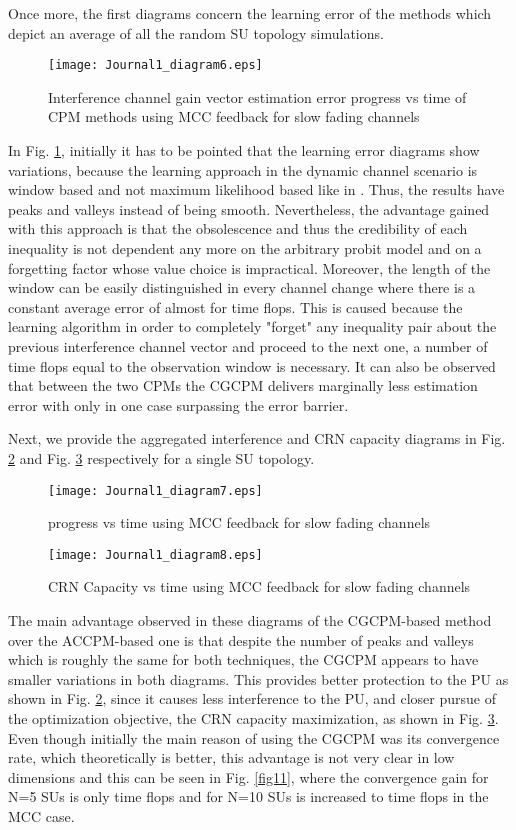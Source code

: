 \documentclass[journal]{IEEEtran}
\begin{document}
Once more, the first diagrams concern the learning error of the methods which depict an average of all the random SU topology simulations.

\begin{figure}[!h]
\centering
\texttt{[image: Journal1\_diagram6.eps]}
\caption{Interference channel gain vector estimation error progress vs time of CPM methods using MCC feedback for slow fading channels}
\label{fig8}
\end{figure}
In Fig. \ref{fig8}, initially it has to be pointed that the learning error diagrams show variations, because the learning approach in the dynamic channel scenario is window based and not maximum likelihood based like in \cite{biban73}. Thus, the results have peaks and valleys instead of being smooth. Nevertheless, the advantage gained with this approach is that the obsolescence and thus the credibility of each inequality is not dependent any more on the arbitrary probit model and on a forgetting factor whose value choice is impractical. Moreover, the length of the window can be easily distinguished in every channel change where there is a constant average error of almost  for  time flops. This is caused because the learning algorithm in order to completely "forget" any inequality pair about the previous interference channel vector and proceed to the next one, a number of time flops equal to the observation window is necessary. It can also be observed that between the two CPMs the CGCPM delivers marginally less estimation error with only in one case surpassing the  error barrier.   

Next, we provide the aggregated interference and CRN capacity diagrams in Fig. \ref{fig9} and Fig. \ref{fig10} respectively for a single SU topology.

\begin{figure}[!h]
\centering
\texttt{[image: Journal1\_diagram7.eps]}
\caption{ progress vs time using MCC feedback for slow fading channels}
\label{fig9}
\end{figure}

\begin{figure}[!h]
\centering
\texttt{[image: Journal1\_diagram8.eps]}
\caption{CRN Capacity vs time using MCC feedback for slow fading channels}
\label{fig10}
\end{figure}
The main advantage observed in these diagrams of the CGCPM-based method over the ACCPM-based one is that despite the number of peaks and valleys which is roughly the same for both techniques, the CGCPM appears to have smaller variations in both diagrams. This provides better protection to the PU as shown in Fig. \ref{fig9}, since it causes less interference to the PU, and closer pursue of the optimization objective, the CRN capacity maximization, as shown in Fig. \ref{fig10}. Even though initially the main reason of using the CGCPM was its convergence rate, which theoretically is better, this advantage is not very clear in low dimensions and this can be seen in Fig. \ref{fig11}, where the convergence gain for N=5 SUs is only  time flops and for N=10 SUs is increased to  time flops in the MCC case.
\end{document}
